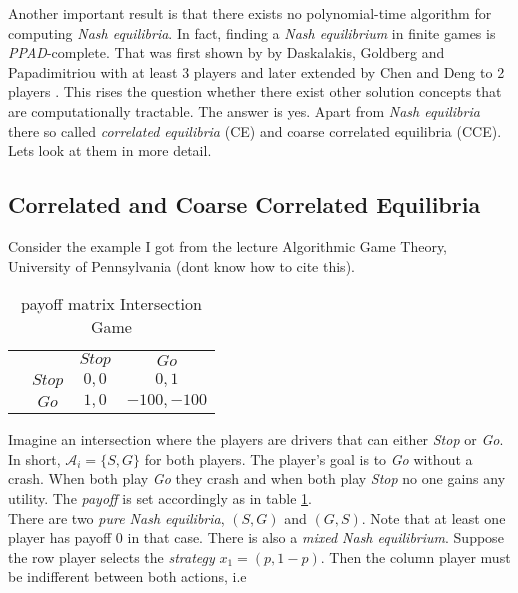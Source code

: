 Another important result is that there exists no polynomial-time algorithm for computing \textit{Nash equilibria}. In fact,  finding a \textit{Nash equilibrium} in finite games is \textit{PPAD}-complete. That was first shown by by Daskalakis, Goldberg and Papadimitriou  with at least 3 players \cite{daskalakis} and later extended by Chen and Deng to 2 players \cite{chen}. This rises the question whether there exist other solution concepts that are computationally tractable. The answer is yes. Apart from \textit{Nash equilibria} there so called \textit{correlated equilibria} (CE) and {coarse correlated equilibria} (CCE). Lets look at them in more detail.

\subsection{Correlated and Coarse Correlated Equilibria}\label{subsection:CEandCCE}

Consider the example I got from the lecture Algorithmic Game Theory, University of Pennsylvania (dont know how to cite this). 

\begin{table}[H]\centering
\setlength{\extrarowheight}{2pt}
\begin{tabular}{cc|c|c|}
  & \multicolumn{1}{c}{} & \multicolumn{1}{c}{$Stop$}  & \multicolumn{1}{c}{$Go$} \\\cline{3-4}
  & $Stop$ & $0,0$ & $0,1$ \\\cline{3-4}
  & $Go$ & $1,0$ & $-100,-100$ \\\cline{3-4}
\end{tabular}\caption{\label{tab:payoffIntersectionfromFiniteGames}payoff matrix Intersection Game}
\end{table}

Imagine an intersection where the players are drivers that can either \textit{Stop} or \textit{Go}. In short, $\mathcal{A}_i = \{S,G\}$ for both players. The player's goal is to \textit{Go} without a crash. When both play \textit{Go} they crash and when both play \textit{Stop} no one gains any utility. The \textit{payoff} is set accordingly as in table \ref{tab:payoffIntersectionfromFiniteGames}. \\

There are two \textit{pure Nash equilibria}, $(S,G)$ and $(G,S)$. Note that at least one player has payoff $0$ in that case. There is also a \textit{mixed Nash equilibrium}. Suppose the row player selects the \textit{strategy} $x_1 = (p,1-p)$. Then the column player must be indifferent between both actions, i.e 

